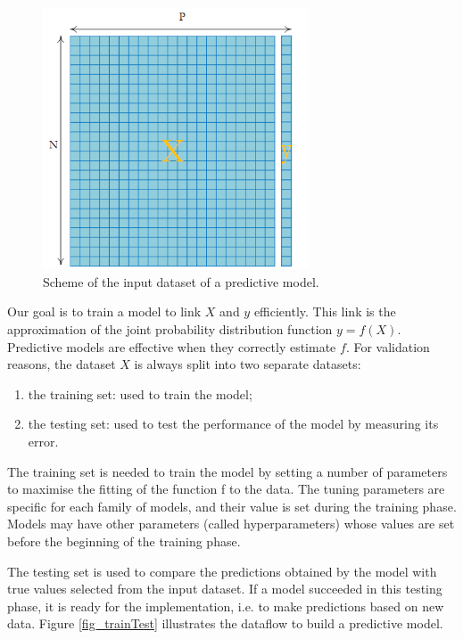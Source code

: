 \begin{figure}[hbt!]
\centering
\includegraphics[width=0.7\textwidth]{SectionLetsMath/linearRegression_figures/fig_learningTable.png}
\captionsetup{type=figure}
\caption{Scheme of the input dataset of a predictive model.}
\label{fig_learningTable}
\end{figure}

Our goal is to train a model to link $X$ and $y$ efficiently. This link is the approximation of the joint probability distribution function $y=f(X)$. Predictive models are effective when they correctly estimate $f$. For validation reasons, the dataset $X$ is always split into two separate datasets:
\begin{enumerate}
    \item the training set: used to train the model;
    \item the testing set: used to test the performance of the model by measuring its error.
\end{enumerate}

The training set is needed to train the model by setting a number of parameters to maximise the fitting of the function f to the data. The tuning parameters are specific for each family of models, and their value is set during the training phase. Models may have other parameters (called hyperparameters) whose values are set before the beginning of the training phase. \par
The testing set is used to compare the predictions obtained by the model with true values selected from the input dataset. If a model succeeded in this testing phase, it is ready for the implementation, i.e. to make predictions based on new data. Figure \ref{fig_trainTest} illustrates the dataflow to build a predictive model.


